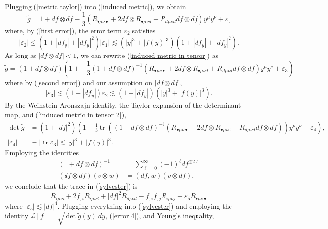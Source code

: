 \documentclass[reqno,12pt,letterpaper]{amsart}
\newcommand{\tr}{\operatorname{tr}}
\theoremstyle{definition}
\numberwithin{equation}{section}
\begin{document}
Plugging (\ref{metric taylor}) into (\ref{induced metric}), we obtain
\begin{equation}\label{induced metric in tensor}
\tilde g = 1 + df \otimes df - \frac{1}{3}(R_{\bullet \mu \nu \bullet} + 2df \otimes R_{\bullet \mu \nu d} + R_{d \mu \nu d} df \otimes df) y^\mu y^\nu + \varepsilon_2
\end{equation}
where, by (\ref{first error}), the error term $\varepsilon_2$ satisfies
\begin{equation}\label{second error}
|\varepsilon_2| \leq (1 + |df_y| + |df_y|^2) |\varepsilon_1| \lesssim (|y|^3 + |f(y)|^3)(1 + |df_y| + |df_y|^2).
\end{equation}
As long as $|df \otimes df| < 1$, we can rewrite (\ref{induced metric in tensor}) as
\begin{equation}\label{induced metric in tensor 2}
\tilde g = (1 + df \otimes df)\left(1 + -\frac{1}{3}(1 + df \otimes df)^{-1}(R_{\bullet \mu \nu \bullet} + 2df \otimes R_{\bullet \mu \nu d} + R_{d \mu \nu d} df \otimes df) y^\mu y^\nu + \varepsilon_3\right)
\end{equation}
where by (\ref{second error}) and our assumption on $|df \otimes df|$,
\begin{equation}\label{third error}
|\varepsilon_3| \lesssim (1 + |df_y|)\varepsilon_2 \lesssim (1 + |df_y|)(|y|^3 + |f(y)|^3).
\end{equation}
By the Weinstein-Aronszajn identity, the Taylor expansion of the determinant map, and (\ref{induced metric in tensor 2}),
\begin{align}\label{sylvester}
\det \tilde g &= (1 + |df|^2)\left(1 - \frac{1}{3} \tr ((1 + df \otimes df)^{-1} (R_{\bullet\mu\nu \bullet} + 2df \otimes R_{\bullet \mu \nu d} + R_{d \mu \nu d} df \otimes df)) y^\mu y^\nu + \varepsilon_4\right),\\
\label{error 4}
|\varepsilon_4| &= |\tr \varepsilon_3| \lesssim |y|^3 + |f(y)|^3.
\end{align}
Employing the identities
\begin{align*}
(1 + df \otimes df)^{-1} &= \sum_{\ell=0}^\infty (-1)^\ell df^{\otimes 2\ell} \\
(df \otimes df)(v \otimes w) &= (df, w)(v \otimes df),
\end{align*}
we conclude that the trace in (\ref{sylvester}) is
$$R_{i\mu \nu i} + 2f_{,i} R_{i\mu \nu d} + |df|^2 R_{d\mu \nu d} - f_{,i} f_{,j} R_{i\mu \nu j} + \varepsilon_5 R_{\bullet \mu \nu \bullet}$$
where $|\varepsilon_5| \lesssim |df|^4$.
Plugging everything into (\ref{sylvester}) and employing the identity $\mathscr L[f] = \sqrt{\det \tilde g(y)} ~dy$, (\ref{error 4}), and Young's inequality,
\end{document}
